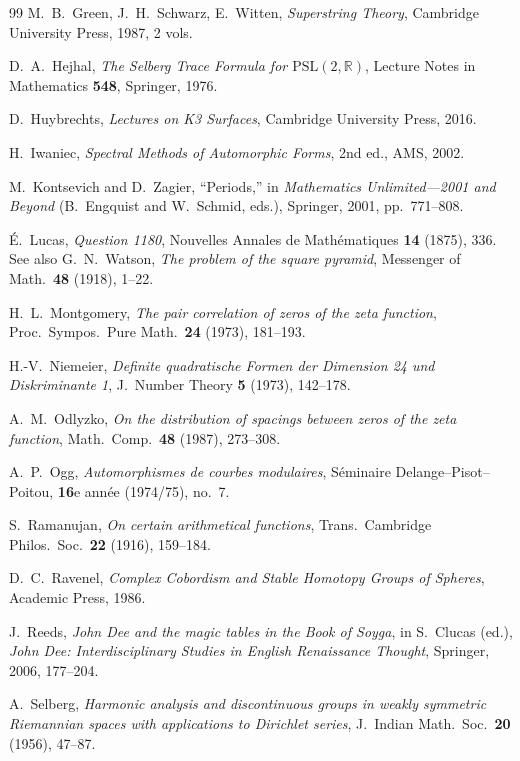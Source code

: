 \documentclass[11pt,a4paper]{article}
\theoremstyle{plain}
\theoremstyle{remark}
\newcommand{\R}{\mathbb{R}}
\begin{document}
\begin{thebibliography}{99}
M.~B.~Green, J.~H.~Schwarz, E.~Witten,
\emph{Superstring Theory},
Cambridge University Press, 1987, 2 vols.

D.~A.~Hejhal,
\emph{The Selberg Trace Formula for $\mathrm{PSL}(2,\R)$},
Lecture Notes in Mathematics \textbf{548}, Springer, 1976.

D.~Huybrechts,
\emph{Lectures on K3 Surfaces},
Cambridge University Press, 2016.

H.~Iwaniec,
\emph{Spectral Methods of Automorphic Forms},
2nd ed., AMS, 2002.

M.~Kontsevich and D.~Zagier,
``Periods,''
in \emph{Mathematics Unlimited---2001 and Beyond}
(B.~Engquist and W.~Schmid, eds.),
Springer, 2001, pp.~771--808.

\'E.~Lucas,
\emph{Question 1180},
Nouvelles Annales de Math\'ematiques \textbf{14} (1875), 336.
See also G.~N.~Watson,
\emph{The problem of the square pyramid},
Messenger of Math.\ \textbf{48} (1918), 1--22.

H.~L.~Montgomery,
\emph{The pair correlation of zeros of the zeta function},
Proc.\ Sympos.\ Pure Math.\ \textbf{24} (1973), 181--193.

H.-V.~Niemeier,
\emph{Definite quadratische Formen der Dimension 24 und
Diskriminante 1},
J.~Number Theory \textbf{5} (1973), 142--178.

A.~M.~Odlyzko,
\emph{On the distribution of spacings between zeros of the zeta
function},
Math.\ Comp.\ \textbf{48} (1987), 273--308.

A.~P.~Ogg,
\emph{Automorphismes de courbes modulaires},
S\'eminaire Delange--Pisot--Poitou, \textbf{16}e ann\'ee (1974/75),
no.~7.

S.~Ramanujan,
\emph{On certain arithmetical functions},
Trans.\ Cambridge Philos.\ Soc.\ \textbf{22} (1916), 159--184.

D.~C.~Ravenel,
\emph{Complex Cobordism and Stable Homotopy Groups of Spheres},
Academic Press, 1986.

J.~Reeds,
\emph{John Dee and the magic tables in the Book of Soyga},
in S.~Clucas (ed.), \emph{John Dee: Interdisciplinary Studies
in English Renaissance Thought}, Springer, 2006, 177--204.

A.~Selberg,
\emph{Harmonic analysis and discontinuous groups in weakly symmetric
Riemannian spaces with applications to Dirichlet series},
J.~Indian Math.\ Soc.\ \textbf{20} (1956), 47--87.

\end{thebibliography}
\end{document}
